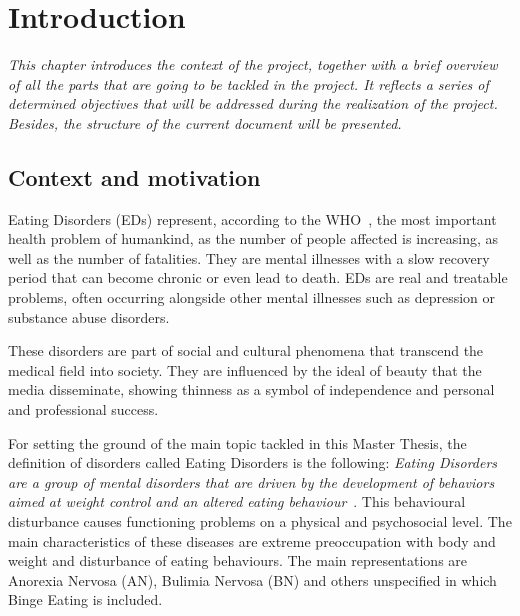 \chapter{Introduction}
\label{chap:introduction}

\textit{This chapter introduces the context of the project, together with a brief overview of all the parts that are going to be tackled in the project. It reflects a series of determined objectives that will be addressed during the realization of the project. Besides, the structure of the current document will be presented.
}



\clearpage

\section{Context and motivation}
\label{sec:context}


Eating Disorders (EDs) represent, according to the WHO~\cite{baldares2013trastornos}, the most important health problem of humankind, as the number of people affected is increasing, as well as the number of fatalities. They are mental illnesses with a slow recovery period that can become chronic or even lead to death. EDs are real and treatable problems, often occurring alongside other mental illnesses such as depression or substance abuse disorders.

These disorders are part of social and cultural phenomena that transcend the medical field into society. They are influenced by the ideal of beauty that the media disseminate, showing thinness as a symbol of independence and personal and professional success.


For setting the ground of the main topic tackled in this Master Thesis, the definition of disorders called Eating Disorders is the following: \textit{Eating Disorders are a group of mental disorders that are driven by the development of behaviors aimed at weight control and an altered eating behaviour}~\cite{baldares2013trastornos}. This behavioural disturbance causes functioning problems on a physical and psychosocial level. The main characteristics of these diseases are extreme preoccupation with body and weight and disturbance of eating behaviours. The main representations are Anorexia Nervosa (AN), Bulimia Nervosa (BN) and others unspecified in which Binge Eating is included.


